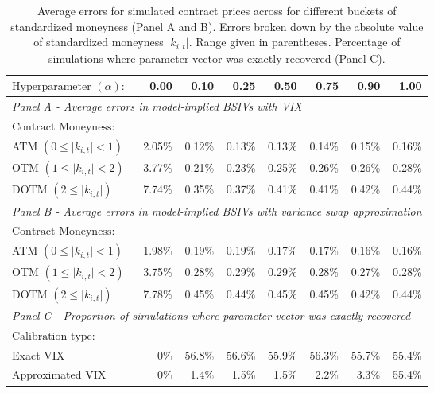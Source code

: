 \documentclass[12pt]{article}
\begin{document}
\begin{table}[!t]
    \centering
\begin{tabular}{lrrrrrrr}
\toprule
$\text{Hyperparameter } (\alpha):$ & 0.00 & 0.10 & 0.25 & 0.50 & 0.75 & 0.90 & 1.00 \\
\midrule
\multicolumn{8}{l}{\textit{Panel A - Average errors in model-implied BSIVs with VIX}}\\
$\text{Contract Moneyness: }$ &   &   &   &   &   &   &   \\
ATM $(0 \leq \vert k_{i,t}\vert < 1)$  & 2.05\% & 0.12\% & 0.13\% & 0.13\% & 0.14\% & 0.15\% & 0.16\% \\
OTM $(1 \leq \vert k_{i,t}\vert < 2)$ & 3.77\% & 0.21\% & 0.23\% & 0.25\% & 0.26\% & 0.26\% & 0.28\% \\
DOTM $(2 \leq \vert k_{i,t}\vert)$ & 7.74\% & 0.35\% & 0.37\% & 0.41\% & 0.41\% & 0.42\% & 0.44\% \\
\midrule
\multicolumn{8}{l}{\textit{Panel B - Average errors in model-implied BSIVs with variance swap approximation}}\\
$\text{Contract Moneyness: }$ &   &   &   &   &   &   &   \\
ATM $(0 \leq \vert k_{i,t}\vert < 1)$ & 1.98\% & 0.19\% & 0.19\% & 0.17\% & 0.17\% & 0.16\% & 0.16\% \\
OTM  $(1 \leq \vert k_{i,t}\vert < 2)$ & 3.75\% & 0.28\% & 0.29\% & 0.29\% & 0.28\% & 0.27\% & 0.28\% \\
DOTM $(2 \leq \vert k_{i,t}\vert)$  & 7.78\% & 0.45\% & 0.44\% & 0.45\% & 0.45\% & 0.42\% & 0.44\% \\
\midrule 
\multicolumn{8}{l}{\textit{Panel C - Proportion of simulations where parameter vector was exactly recovered}}\\
$\text{Calibration type: }$ &   &   &   &   &   &   &   \\
Exact VIX & 0\% & 56.8\% & 56.6\% & 55.9\% & 56.3\% & 55.7\% & 55.4\% \\
Approximated VIX & 0\%  & 1.4\%  & 1.5\%  & 1.5\%  & 2.2\%  & 3.3\% & 55.4\%\\
\bottomrule
\end{tabular}
    \caption{Average errors for simulated contract prices across for different buckets of standardized moneyness (Panel A and B). Errors broken down by the absolute value of standardized moneyness $\vert k_{i,t} \vert$. Range given in parentheses. Percentage of simulations where parameter vector was exactly recovered (Panel C). }
    \label{tab:simulation_results}
\end{table}
\end{document}
